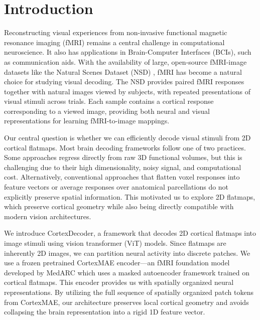 \documentclass[conference]{IEEEtran}
\begin{document}

\section{Introduction}
\label{sec:intro}

Reconstructing visual experiences from non-invasive functional magnetic resonance imaging (fMRI) remains a central challenge in computational neuroscience. It also has applications in Brain-Computer Interfaces (BCIs), such as communication aids. With the availability of large, open-source fMRI-image datasets like the Natural Scenes Dataset (NSD) \cite{Allen2022Massive7TfMRI}, fMRI has become a natural choice for studying visual decoding. The NSD provides paired fMRI responses together with natural images viewed by subjects, with repeated presentations of visual stimuli across trials. Each sample contains a cortical response corresponding to a viewed image, providing both neural and visual representations for learning fMRI-to-image mappings.

Our central question is whether we can efficiently decode visual stimuli from 2D cortical flatmaps. Most brain decoding frameworks follow one of two practices. Some approaches regress directly from raw 3D functional volumes, but this is challenging due to their high dimensionality, noisy signal, and computational cost. Alternatively, conventional approaches that flatten voxel responses into feature vectors or average responses over anatomical parcellations do not explicitly preserve spatial information. This motivated us to explore 2D flatmaps, which preserve cortical geometry while also being directly compatible with modern vision architectures.

We introduce CortexDecoder, a framework that decodes 2D cortical flatmaps into image stimuli using vision transformer (ViT) \cite{dosovitskiy2021imageworth16x16words} models. Since flatmaps are inherently 2D images, we can partition neural activity into discrete patches. We use a frozen pretrained CortexMAE \cite{lane2026scalingvisiontransformersfunctional} encoder---an fMRI foundation model developed by MedARC which uses a masked autoencoder framework trained on cortical flatmaps. This encoder provides us with spatially organized neural representations. By utilizing the full sequence of spatially organized patch tokens from CortexMAE, our architecture preserves local cortical geometry and avoids collapsing the brain representation into a rigid 1D feature vector.
\end{document}
